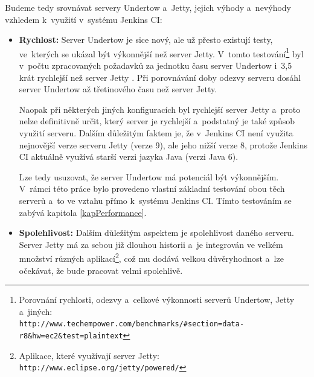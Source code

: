             \medskip
            Budeme tedy srovnávat servery Undertow a~Jetty, jejich výhody a~nevýhody
            vzhledem k~využití v~systému Jenkins CI:
            \begin{itemize}
                \item {\textbf{Rychlost:} Server Undertow je sice nový, ale už přesto existují
                    testy, ve~kterých se ukázal být výkonnější než server Jetty. V~tomto           
                    testování\footnote{Porovnání rychlosti, odezvy a~celkové výkonnosti serverů Undertow, Jetty a~jiných: 
                    \\\texttt{http://www.techempower.com/benchmarks/\#section=data-r8\&hw=ec2\&test=plaintext}}
                    byl v~počtu zpracovaných 
                    požadavků za jednotku času server Undertow i~3,5 krát rychlejší než server Jetty . Při porovnávání doby odezvy serveru 
                    dosáhl server Undertow až třetinového času než server Jetty. 
                    
                    Naopak při některých
                    jiných konfiguracích byl rychlejší server Jetty a~proto nelze definitivně určit,
                    který server je rychlejší a~podstatný je také způsob využití serveru. 
                    Dalším důležitým faktem je, že v~Jenkins CI není využita nejnovější verze serveru
                    Jetty (verze 9), ale jeho nižší verze 8, protože Jenkins CI aktuálně využívá
                    starší verzi jazyka Java (verzi Java 6).
                    
                    Lze tedy usuzovat, že server Undertow má potenciál být výkonnějším.
                    V~rámci této práce bylo provedeno vlastní základní testování 
                    obou těch serverů a~to ve vztahu přímo k~systému Jenkins CI. Tímto testováním
                    se zabývá kapitola \ref{kapPerformance}.
                    }

                \item{\textbf{Spolehlivost:} Dalším důležitým aspektem je spolehlivost daného serveru. 
                        Server Jetty má za sebou již dlouhou historii a~je integrován ve velkém množství
                        různých aplikací\footnote{Aplikace, které využívají server Jetty: \texttt{http://www.eclipse.org/jetty/powered/}},
                        což mu dodává velkou důvěryhodnost a~lze očekávat, že bude pracovat velmi 
                        spolehlivě. 
                        
}
\end{itemize}
